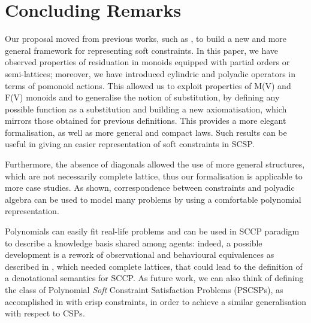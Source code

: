 \documentclass{llncs}
\begin{document}
\section{Concluding Remarks}\label{sec:conclusion}
Our proposal moved from previous works, such as \cite{ipl17,jlamp17}, to build a new and more general
framework for representing soft constraints. In this paper, we have observed properties of residuation
in monoids equipped with partial orders or semi-lattices; moreover, we have introduced cylindric
and polyadic operators in terms of pomonoid actions. This allowed us to exploit
properties of M(V) and F(V) monoids and to generalise the notion of substitution,
by defining any possible function as a substitution and building a new axiomatisation,
which mirrors those obtained for previous definitions.
This provides a more elegant formalisation, as well as more general and compact laws.
Such results can be useful in giving an easier representation of soft constraints in SCSP.

Furthermore, the absence of diagonals allowed the use of more general structures, which are not 
necessarily complete lattice, thus our formalisation is applicable to more case studies.
As shown, correspondence between constraints and polyadic algebra can be used to model
many problems by using a comfortable polynomial representation. 

Polynomials can easily fit real-life problems and can be used in SCCP paradigm to describe a knowledge
basis shared among agents: indeed, a possible development is a rework of observational
and behavioural equivalences as described in \cite{jlamp17}, which needed complete lattices,
that could lead to the definition of a denotational semantics for SCCP.
As future work, we can also think of defining the class of Polynomial \emph{Soft} Constraint Satisfaction Problems (PSCSPs), 
as accomplished in \cite{pcsp09} with crisp constraints, in order to achieve a similar generalisation with respect to CSPs.




\end{document}
